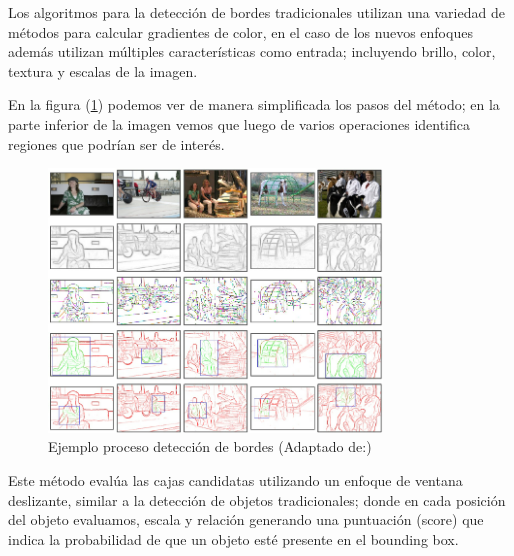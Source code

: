 Los algoritmos para la detección de bordes tradicionales utilizan una variedad de métodos para calcular gradientes de color, en el caso de los nuevos enfoques además utilizan múltiples características como entrada; incluyendo brillo, color, textura y  escalas de la imagen. 

En la figura (\ref{Fig: edges}) podemos ver de manera simplificada los pasos del método;  en la parte inferior de la imagen vemos que luego de varios operaciones identifica regiones que podrían ser de interés.

\begin{figure}[H]
 \centering
  \includegraphics[height=7cm,keepaspectratio=true,clip=true]{imagenes/Logos/edges.png}
  \caption{Ejemplo proceso detección de bordes (Adaptado de:\citep{edges})}
	\label{Fig: edges}
\end{figure}

Este método evalúa las cajas candidatas utilizando un enfoque de ventana deslizante, similar a la detección de objetos tradicionales; donde en cada posición del objeto evaluamos, escala y relación generando una puntuación (score) que indica la probabilidad de que un objeto esté presente en el bounding box.



